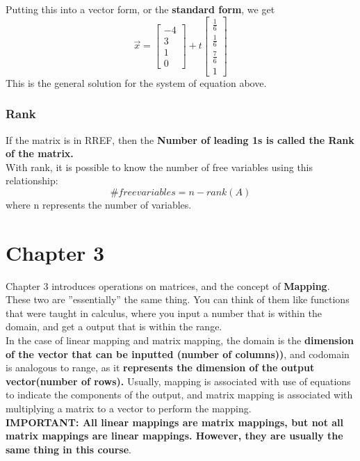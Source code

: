 \documentclass[12pt]{article}
\begin{document}
Putting this into a vector form, or the \textbf{standard form},  we get\\
\begin{equation}
\vec{x} = \begin{bmatrix}-4\\3\\1\\0\end{bmatrix} + t\begin{bmatrix}\frac{1}{6}\\\frac{1}{6}\\\frac{7}{6}\\1\end{bmatrix}
\end{equation}
This is the general solution for the system of equation above.

\subsubsection{Rank}
If the matrix is in RREF, then the \textbf{Number of leading 1s is called the Rank of the matrix.}\\
With rank, it is possible to know the number of free variables using this relationship:
\begin{equation}
\#free variables = n - rank(A)
\end{equation}
where n represents the number of variables. 

\section{Chapter 3}
Chapter 3 introduces  operations on matrices, and the concept of \textbf{Mapping}. %
These two are ''essentially'' the same thing. You can think of them like functions that were taught in calculus, where you input a number that is within the domain, and get a output that is within the range.\\
In the case of linear mapping and matrix mapping, the domain is the \textbf{dimension of the vector that can be inputted (number of columns))}, and codomain is analogous to range, as it \textbf{represents the dimension of the output vector(number of rows).} 
Usually, mapping is associated with use of equations to indicate the components of the output, and matrix mapping is associated with multiplying a matrix to a vector to perform the mapping.\\
\textbf{IMPORTANT: All linear mappings are matrix mappings, but not all matrix mappings are linear mappings. However, they are usually the same thing in this course}.
\end{document}

